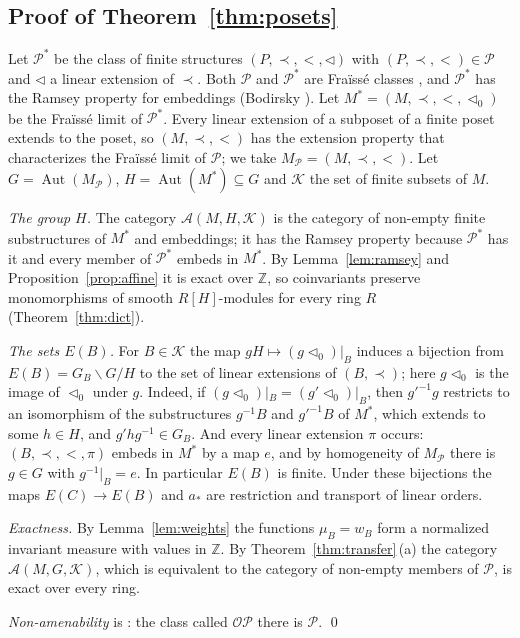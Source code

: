 \documentclass[11pt,a4paper]{article}
\theoremstyle{definition}
\newcommand{\A}{\mathcal{A}}
\newcommand{\K}{\mathcal{K}}
\newcommand{\Po}{\mathcal{P}}
\newcommand{\Z}{\mathbb{Z}}
\newcommand{\Aut}{\operatorname{Aut}}
\begin{document}
\subsection{Proof of Theorem~\ref{thm:posets}}

Let $\Po^*$ be the class of finite structures $(P,\prec,<,\lhd)$ with
$(P,\prec,<)\in\Po$ and $\lhd$ a linear extension of $\prec$. Both $\Po$
and $\Po^*$ are Fra\"iss\'e classes \cite[Remark~3.2]{KS}, and $\Po^*$ has
the Ramsey property for embeddings (Bodirsky \cite[Corollary~1.4\,(3)]{Bo}).
Let $M^*=(M,\prec,<,\lhd_0)$ be the Fra\"iss\'e limit of $\Po^*$. Every
linear extension of a subposet of a finite poset extends to the poset, so
$(M,\prec,<)$ has the extension property that characterizes the Fra\"iss\'e
limit of $\Po$; we take $M_{\Po}=(M,\prec,<)$. Let $G=\Aut(M_{\Po})$,
$H=\Aut(M^*)\subseteq G$ and $\K$ the set of finite subsets of $M$.

\emph{The group $H$.} The category $\A(M,H,\K)$ is the category of
non-empty finite substructures of $M^*$ and embeddings; it has the Ramsey
property because $\Po^*$ has it and every member of $\Po^*$ embeds in
$M^*$. By Lemma~\ref{lem:ramsey} and Proposition~\ref{prop:affine} it is
exact over $\Z$, so coinvariants preserve monomorphisms of smooth
$R[H]$-modules for every ring $R$ (Theorem~\ref{thm:dict}).

\emph{The sets $E(B)$.} For $B\in\K$ the map $gH\mapsto(g\lhd_0)|_B$
induces a bijection from $E(B)=G_B\backslash G/H$ to the set of linear
extensions of $(B,\prec)$; here $g\lhd_0$ is the image of $\lhd_0$ under
$g$. Indeed, if $(g\lhd_0)|_B=(g'\lhd_0)|_B$, then $g'^{-1}g$ restricts to
an isomorphism of the substructures $g^{-1}B$ and $g'^{-1}B$ of $M^*$, which
extends to some $h\in H$, and $g'hg^{-1}\in G_B$. And every linear extension
$\pi$ occurs: $(B,\prec,<,\pi)$ embeds in $M^*$ by a map $e$, and by
homogeneity of $M_{\Po}$ there is $g\in G$ with $g^{-1}|_B=e$. In
particular $E(B)$ is finite. Under these bijections the maps
$E(C)\to E(B)$ and $a_*$ are restriction and transport of linear orders.

\emph{Exactness.} By Lemma~\ref{lem:weights} the functions $\mu_B=w_B$ form
a normalized invariant measure with values in $\Z$. By
Theorem~\ref{thm:transfer}\,(a) the category $\A(M,G,\K)$, which is
equivalent to the category of non-empty members of $\Po$, is exact over
every ring.

\emph{Non-amenability} is \cite[Remark~3.2]{KS}: the class called
$\mathcal{OP}$ there is $\Po$. \qed
\end{document}
